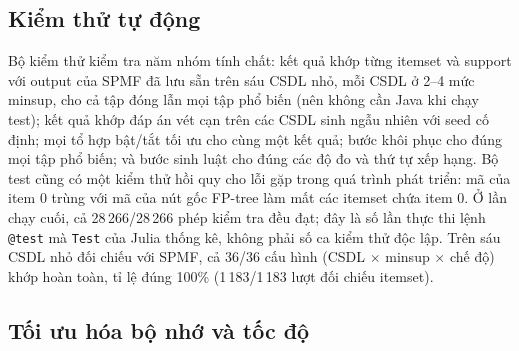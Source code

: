 \subsection{Kiểm thử tự động}
\label{sec:tests}

Bộ kiểm thử  kiểm tra năm nhóm tính chất: kết quả khớp từng itemset và support với output của
SPMF đã lưu sẵn trên sáu CSDL nhỏ, mỗi CSDL ở 2--4 mức minsup, cho cả tập đóng lẫn mọi tập phổ biến (nên không cần Java
khi chạy test); kết quả khớp đáp án vét cạn trên các CSDL sinh ngẫu nhiên với seed cố định; mọi tổ hợp bật/tắt tối ưu
cho cùng một kết quả; bước khôi phục cho đúng mọi tập phổ biến; và bước sinh luật cho đúng các độ đo và thứ tự xếp
hạng. Bộ test cũng có một kiểm thử hồi quy cho lỗi gặp trong quá trình phát triển: mã của item 0 trùng với mã của nút
gốc FP-tree làm mất các itemset chứa item 0. Ở lần chạy cuối, cả 28\,266/28\,266 phép kiểm tra đều đạt; đây là số lần thực thi lệnh \texttt{@test} mà
\texttt{Test} của Julia thống kê, không phải số ca kiểm thử độc lập. Trên sáu CSDL nhỏ đối chiếu với SPMF, cả 36/36 cấu hình (CSDL $\times$ minsup $\times$ chế độ)
khớp hoàn toàn, tỉ lệ đúng 100\% (1\,183/1\,183 lượt đối chiếu itemset).

\subsection{Tối ưu hóa bộ nhớ và tốc độ}
\label{sec:optimizations}

